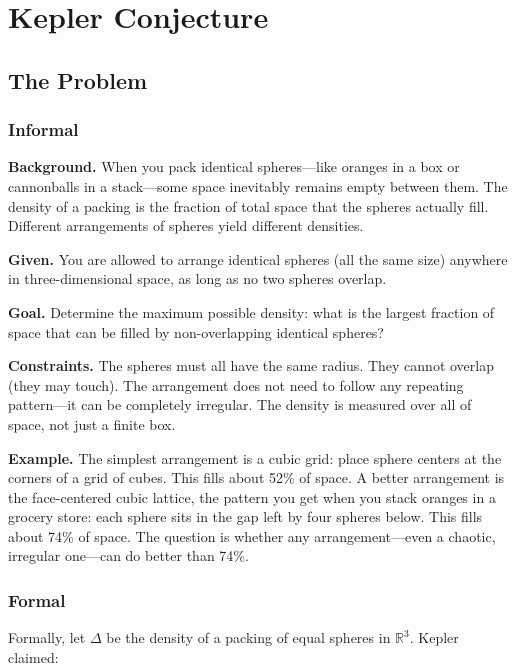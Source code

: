 \let\LocalMacro\relax

\chapter{Kepler Conjecture}

\section{The Problem}

\subsection{Informal}

\textbf{Background.} When you pack identical spheres---like oranges in a box or cannonballs in a stack---some space inevitably remains empty between them. The density of a packing is the fraction of total space that the spheres actually fill. Different arrangements of spheres yield different densities.

\textbf{Given.} You are allowed to arrange identical spheres (all the same size) anywhere in three-dimensional space, as long as no two spheres overlap.

\textbf{Goal.} Determine the maximum possible density: what is the largest fraction of space that can be filled by non-overlapping identical spheres?

\textbf{Constraints.} The spheres must all have the same radius. They cannot overlap (they may touch). The arrangement does not need to follow any repeating pattern---it can be completely irregular. The density is measured over all of space, not just a finite box.

\textbf{Example.} The simplest arrangement is a cubic grid: place sphere centers at the corners of a grid of cubes. This fills about 52\% of space. A better arrangement is the face-centered cubic lattice, the pattern you get when you stack oranges in a grocery store: each sphere sits in the gap left by four spheres below. This fills about 74\% of space. The question is whether any arrangement---even a chaotic, irregular one---can do better than 74\%.

\subsection{Formal}
Formally, let $\Delta$ be the density of a packing of equal spheres in $\mathbb{R}^3$. Kepler claimed:

